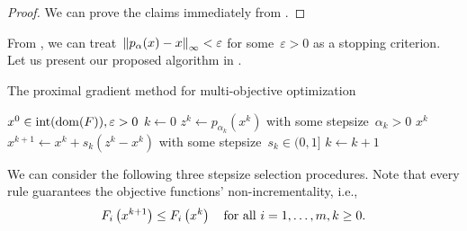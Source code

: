 \documentclass[../main]{subfiles}
\begin{document}
\begin{proof}
    We can prove the claims immediately from .
\end{proof}

From , we can treat~$\norm*{p_\alpha(x) - x}_\infty < \varepsilon$ for some~$\varepsilon > 0$ as a stopping criterion.
Let us present our proposed algorithm in .
\begin{algorithm}[hbtp]
    \caption{The proximal gradient method for multi-objective optimization}
    \begin{algorithmic}[1]
        \Require $x^0 \in \interior (\dom (F)), \varepsilon > 0$
        \State $k \gets 0$
        \Loop
        \State $z^k \gets p_{\alpha_k}\left(x^k\right)$ with some stepsize~$\alpha_k > 0$ 
        \State \Return $x^k$
        \EndIf
        \State $x^{k + 1} \gets x^k + s_k \left(z^k - x^k\right)$ with some stepsize~$s_k \in (0, 1]$ 
        \State $k \gets k + 1$
        \EndLoop
    \end{algorithmic}
\end{algorithm}
We can consider the following three stepsize selection procedures.
Note that every rule guarantees the objective functions' non-incrementality, i.e.,
\begin{equation} \label{eq:pgm_nonincrementality}
    F_i\left(x^{k + 1}\right) \le F_i\left(x^k\right) \forallcondition{i = 1, \dots, m, k \geq 0}
    .\end{equation}
\end{document}

